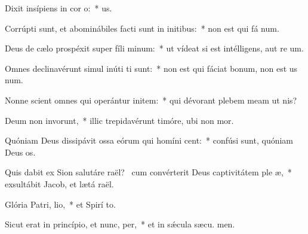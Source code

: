 \item Dixit insípiens in cor o:~*   us.
\item Corrúpti sunt, et abominábiles facti sunt in initibus:~* non est qui fá num.
\item Deus de cælo prospéxit super fíli minum:~* ut vídeat si est intélligens, aut re um.
\item Omnes declinavérunt simul inúti ti sunt:~* non est qui fáciat bonum, non est us  num.
\item Nonne scient omnes qui operántur initem:~* qui dévorant plebem meam ut  nis?
\item Deum non invorunt,~* illic trepidavérunt timóre, ubi non  mor.
\item Quóniam Deus dissipávit ossa eórum qui homíni cent:~* confúsi sunt, quóniam Deus  os.
\item Quis dabit ex Sion salutáre raël?~\pscross{} cum convérterit Deus captivitátem ple æ,~* exsultábit Jacob, et lætá raël.
\item Glória Patri,  lio,~* et Spirí to.
\item Sicut erat in princípio, et nunc,  per,~* et in sǽcula sæcu. men.
